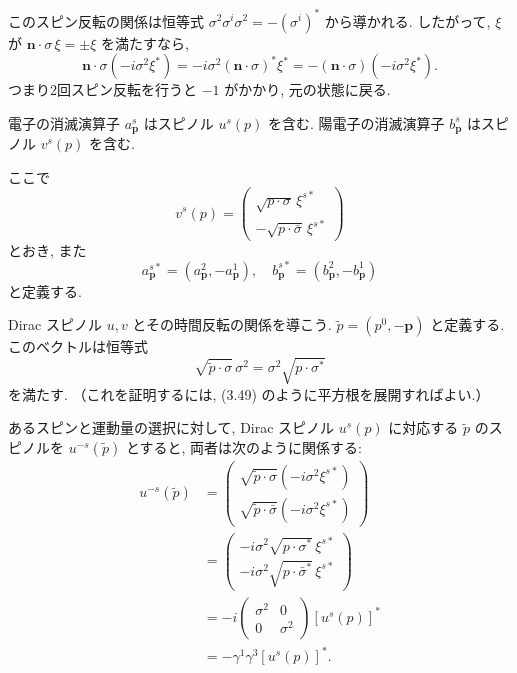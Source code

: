 \documentclass[a4paper,12pt]{article}
\begin{document}
このスピン反転の関係は恒等式 $\sigma^2\sigma^i\sigma^2=-(\sigma^i)^*$ から導かれる.  
したがって, $\xi$ が $\mathbf{n}\cdot\sigma \,\xi=\pm\xi$ を満たすなら,
\begin{equation*}
\mathbf{n}\cdot\sigma (-i\sigma^2 \xi^*)=-i\sigma^2(\mathbf{n}\cdot\sigma)^*\xi^*=-(\mathbf{n}\cdot\sigma)(-i\sigma^2\xi^*).
\end{equation*}
つまり2回スピン反転を行うと $-1$ がかかり, 元の状態に戻る.  

電子の消滅演算子 $a^s_{\mathbf{p}}$ はスピノル $u^s(p)$ を含む.  
陽電子の消滅演算子 $b^s_{\mathbf{p}}$ はスピノル $v^s(p)$ を含む.  

ここで
\begin{equation}
v^s(p) = \begin{pmatrix}\sqrt{p\cdot\sigma}\,\xi^{s*} \\ -\sqrt{p\cdot\bar\sigma}\,\xi^{s*}\end{pmatrix}
\tag{3.136}
\end{equation}
とおき, また
\begin{equation}
a^{s*}_{\mathbf{p}}=(a^2_{\mathbf{p}},-a^1_{\mathbf{p}}), \quad
b^{s*}_{\mathbf{p}}=(b^2_{\mathbf{p}},-b^1_{\mathbf{p}})
\tag{3.137}
\end{equation}
と定義する.  

Dirac スピノル $u, v$ とその時間反転の関係を導こう.  
$\tilde{p}=(p^0,-\mathbf{p})$ と定義する.  
このベクトルは恒等式
\begin{equation*}
\sqrt{\tilde{p}\cdot\sigma}\,\sigma^2 = \sigma^2 \sqrt{p\cdot\sigma^*}
\end{equation*}
を満たす. （これを証明するには, (3.49) のように平方根を展開すればよい.）

あるスピンと運動量の選択に対して, Dirac スピノル $u^s(p)$ に対応する $\tilde{p}$ のスピノルを $u^{-s}(\tilde{p})$ とすると,  
両者は次のように関係する:
\begin{align*}
u^{-s}(\tilde{p}) &=
\begin{pmatrix}
\sqrt{\tilde{p}\cdot\sigma}(-i\sigma^2 \xi^{s*}) \\
\sqrt{\tilde{p}\cdot\bar\sigma}(-i\sigma^2 \xi^{s*})
\end{pmatrix} \\
&=
\begin{pmatrix}
- i\sigma^2 \sqrt{p\cdot\sigma^*}\,\xi^{s*} \\
- i\sigma^2 \sqrt{p\cdot\bar\sigma^*}\,\xi^{s*}
\end{pmatrix} \\
&= -i
\begin{pmatrix}
\sigma^2 & 0 \\ 0 & \sigma^2
\end{pmatrix}[u^s(p)]^* \\
&= -\gamma^1\gamma^3 [u^s(p)]^* .
\end{align*}
\end{document}
